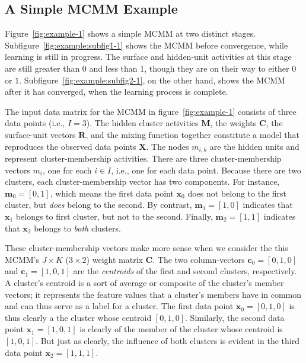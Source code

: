 {\subsection{A Simple MCMM Example}
\label{subsec:example}

Figure~\ref{fig:example-1} shows a simple MCMM at two distinct stages. Subfigure~\ref{fig:example:subfig1-1} shows the MCMM before convergence, while learning is still in progress. The surface and hidden-unit activities at this stage are still greater than $0$ and less than $1$, though they are on their way to either $0$ or $1$. Subfigure~\ref{fig:example:subfig2-1}, on the other hand, shows the MCMM after it has converged, when the learning process is complete.

The input data matrix for the MCMM in figure~\ref{fig:example-1} consists of three data points (i.e., $I = 3$).
The hidden cluster activities $\mathbf{M}$, the weights $\mathbf{C}$, the surface-unit vectors $\mathbf{R}$,
and the mixing function together constitute a model that reproduces the
observed data points $\mathbf{X}$.
The nodes $m_{i,k}$ are the hidden units and represent cluster-membership activities. There are three cluster-membership vectors $m_{i}$, one for each $i \in I$, i.e., one for each data point. Because there are two clusters, each cluster-membership vector has two components. For instance, $\textbf{m}_{0} = [0, 1]$, which means the first data point $\textbf{x}_{0}$ does not belong to the first cluster, but \emph{does} belong to the second. By contrast, $\textbf{m}_{1} = [1,0]$ indicates that $\textbf{x}_{1}$ belongs to first cluster, but not to the second. Finally, $\textbf{m}_{2} = [1,1]$ indicates that  $\textbf{x}_{2}$ belongs to \emph{both} clusters. 

These cluster-membership vectors make more sense when we consider the this MCMM's $J \times K$ ($3 \times 2$) weight matrix $\textbf{C}$. The two column-vectors $\textbf{c}_0 = [0,1,0]$ and $\textbf{c}_1 = [1,0,1]$ are the \emph{centroids} of the first and second clusters, respectively. A cluster's centroid is a sort of average or composite of the cluster's member vectors; it represents the feature values that a cluster's members have in common and can thus serve as a label for a cluster. The first data point $\textbf{x}_0 = [0,1,0]$ is thus clearly a the cluster whose centroid  $[0,1,0]$. Similarly, the second data point $\textbf{x}_1 = [1,0,1]$ is clearly of the member of the cluster whose centroid is $[1,0,1]$. But just as clearly, the influence of both clusters is evident in the third data point $\textbf{x}_2 = [1,1,1]$.

}
